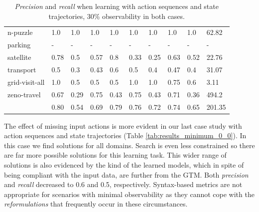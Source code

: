 \begin{table}[hbt!]
\begin{center}
\begin{footnotesize}
\begin{tabular}{l|l|l|l|l|l|l||l|l||l|}
			n-puzzle & 1.0 & 1.0 & 1.0 & 1.0 & 1.0 & 1.0 & 1.0 & 1.0& 62.82 \\ %
			parking & - & - & - & - & - & - & - & - & - \\ %
			satellite & 0.78 & 0.5 & 0.57 & 0.8 & 0.33 & 0.25 & 0.63 & 0.52& 22.76 \\ %
			transport & 0.5 & 0.3 & 0.43 & 0.6 & 0.5 & 0.4 & 0.47 & 0.4& 31.07 \\ %
			grid-visit-all & 1.0 & 0.5 & 0.5 & 0.5 & 1.0 & 1.0 & 0.75 & 0.6& 3.11 \\ %
			zeno-travel & 0.67 & 0.29 & 0.75 & 0.43 & 0.75 & 0.43 & 0.71 & 0.36& 494.2 \\ %
			\hline
			\bf & 0.80 & 0.54 & 0.69 & 0.79 & 0.76 & 0.72 & 0.74 & 0.65 & 201.35 
			
		\end{tabular}
		\end{footnotesize}
	\end{center}
	\caption{\small {\em Precision} and {\em recall} when learning with \PO action sequences and \PO state trajectories, 30\% observability in both cases.}
	\label{tab:results_minimum_30_30}
\end{table}

The effect of missing input actions is more evident in our last case study with \NO action sequences and state trajectories (Table \ref{tab:results_minimum_0_0}). In this case we find solutions for all domains. Search is even less constrained so there are far more possible solutions for this learning task. This wider range of solutions is also evidenced by the kind of the learned models, which in spite of being compliant with the input data, are further from the GTM. Both {\em precision} and {\em recall} decreased to 0.6 and 0.5, respectively. Syntax-based metrics are not appropriate for scenarios with minimal observability as they cannot cope with the \emph{reformulations} that frequently occur in these circumstances. 

